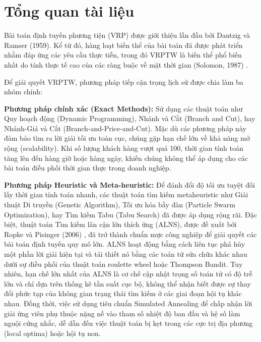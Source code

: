 \documentclass[13pt,a4paper]{extarticle}
\begin{document}
\clearpage
\section{Tổng quan tài liệu}

Bài toán định tuyến phương tiện (VRP) được giới thiệu lần đầu bởi Dantzig và Ramser (1959). Kể từ đó, hàng loạt biến thể của bài toán đã được phát triển nhằm đáp ứng các yêu cầu thực tiễn, trong đó VRPTW là biến thể phổ biến nhất do tính thực tế cao của các ràng buộc về mặt thời gian (Solomon, 1987) \cite{solomon1987}.

Để giải quyết VRPTW, phương pháp tiếp cận trọng lịch sử được chia làm ba nhóm chính:

\textbf{Phương pháp chính xác (Exact Methods):} Sử dụng các thuật toán như Quy hoạch động (Dynamic Programming), Nhánh và Cắt (Branch and Cut), hay Nhánh-Giá và Cắt (Branch-and-Price-and-Cut). Mặc dù các phương pháp này đảm bảo tìm ra lời giải tối ưu toàn cục, chúng gặp hạn chế lớn về khả năng mở rộng (scalability). Khi số lượng khách hàng vượt quá 100, thời gian tính toán tăng lên đến hàng giờ hoặc hàng ngày, khiến chúng không thể áp dụng cho các bài toán điều phối thời gian thực trong doanh nghiệp.

\textbf{Phương pháp Heuristic và Meta-heuristic:} Để đánh đổi độ tối ưu tuyệt đối lấy thời gian tính toán nhanh, các thuật toán tìm kiếm metaheuristic như Giải thuật Di truyền (Genetic Algorithm), Tối ưu hóa bầy đàn (Particle Swarm Optimization), hay Tìm kiếm Tabu (Tabu Search) đã được áp dụng rộng rãi. Đặc biệt, thuật toán Tìm kiếm lân cận lớn thích ứng (ALNS), được đề xuất bởi Ropke và Pisinger (2006) \cite{ropke2006}, đã trở thành chuẩn mực công nghiệp để giải quyết các bài toán định tuyến quy mô lớn. ALNS hoạt động bằng cách liên tục phá hủy một phần lời giải hiện tại và tái thiết nó bằng các toán tử sửa chữa khác nhau dưới sự điều phối của thuật toán roulette wheel hoặc Thompson Bandit. Tuy nhiên, hạn chế lớn nhất của ALNS là cơ chế cập nhật trọng số toán tử có độ trễ lớn và chỉ dựa trên thống kê tần suất cục bộ, không thể nhận biết được sự thay đổi phức tạp của không gian trạng thái tìm kiếm ở các giai đoạn hội tụ khác nhau. Đồng thời, việc sử dụng tiêu chuẩn Simulated Annealing để chấp nhận lời giải ứng viên phụ thuộc nặng nề vào tham số nhiệt độ ban đầu và hệ số làm nguội cứng nhắc, dễ dẫn đến việc thuật toán bị kẹt trong các cực trị địa phương (local optima) hoặc hội tụ non.
\end{document}
